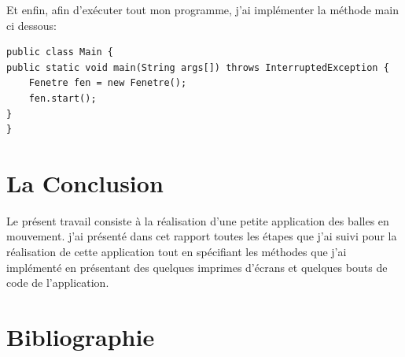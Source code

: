 \documentclass{article}
\begin{document}
Et enfin, afin d'exécuter tout mon programme, j'ai implémenter la méthode main ci dessous: \cite{Openclassr}
\begin{verbatim}
public class Main {
public static void main(String args[]) throws InterruptedException {
	Fenetre fen = new Fenetre();
	fen.start();	
}
}
\end{verbatim}

\section{La Conclusion}

Le présent travail consiste à la réalisation d'une petite application des balles en mouvement.
j'ai présenté dans cet rapport toutes les étapes que j'ai suivi pour la réalisation de cette application tout en spécifiant les méthodes que j'ai implémenté  en présentant des quelques imprimes d'écrans et quelques bouts de code de l'application.  

\section{Bibliographie}





\end{document}
